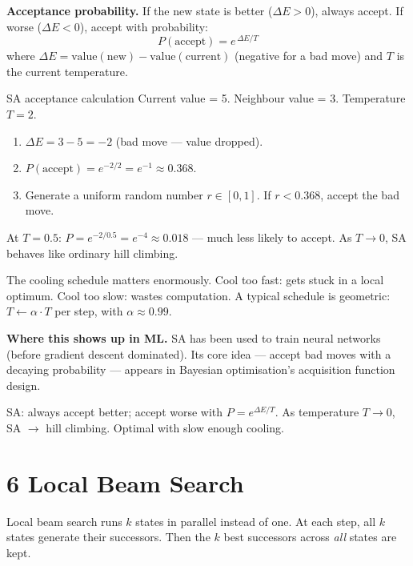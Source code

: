 \documentclass[a4paper,11pt]{article}
\begin{document}
\textbf{Acceptance probability.} If the new state is better ($\Delta E > 0$), always accept. If worse ($\Delta E < 0$), accept with probability:
\[
P(\text{accept}) = e^{\,\Delta E / T}
\]
where $\Delta E = \text{value}(\text{new}) - \text{value}(\text{current})$ (negative for a bad move) and $T$ is the current temperature.

\begin{worked}{SA acceptance calculation}
Current value = 5. Neighbour value = 3. Temperature $T = 2$.
\begin{enumerate}[label=\textbf{Step \arabic*.}]
  \item $\Delta E = 3 - 5 = -2$ (bad move — value dropped).
  \item $P(\text{accept}) = e^{-2/2} = e^{-1} \approx 0.368$.
  \item Generate a uniform random number $r \in [0,1]$. If $r < 0.368$, accept the bad move.
\end{enumerate}
At $T = 0.5$: $P = e^{-2/0.5} = e^{-4} \approx 0.018$ — much less likely to accept. As $T \to 0$, SA behaves like ordinary hill climbing.
\end{worked}

\begin{watchout}
The cooling schedule matters enormously. Cool too fast: gets stuck in a local optimum. Cool too slow: wastes computation. A typical schedule is geometric: $T \leftarrow \alpha \cdot T$ per step, with $\alpha \approx 0.99$.
\end{watchout}

\textbf{Where this shows up in ML.} SA has been used to train neural networks (before gradient descent dominated). Its core idea — accept bad moves with a decaying probability — appears in Bayesian optimisation's acquisition function design.

\begin{keytake}
SA: always accept better; accept worse with $P = e^{\Delta E/T}$. As temperature $T \to 0$, SA $\to$ hill climbing. Optimal with slow enough cooling.
\end{keytake}

\section{6 \quad Local Beam Search}

Local beam search runs $k$ states in parallel instead of one. At each step, all $k$ states generate their successors. Then the $k$ best successors across \emph{all} states are kept.
\end{document}

